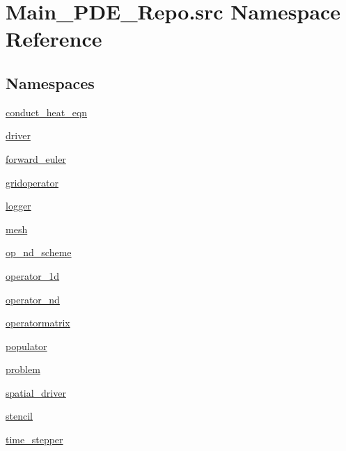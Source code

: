 \hypertarget{namespaceMain__PDE__Repo_1_1src}{}\section{Main\+\_\+\+P\+D\+E\+\_\+\+Repo.\+src Namespace Reference}
\label{namespaceMain__PDE__Repo_1_1src}
\subsection*{Namespaces}
\begin{DoxyCompactItemize}
\item 
 \hyperlink{namespaceMain__PDE__Repo_1_1src_1_1conduct__heat__eqn}{conduct\+\_\+heat\+\_\+eqn}
\item 
 \hyperlink{namespaceMain__PDE__Repo_1_1src_1_1driver}{driver}
\item 
 \hyperlink{namespaceMain__PDE__Repo_1_1src_1_1forward__euler}{forward\+\_\+euler}
\item 
 \hyperlink{namespaceMain__PDE__Repo_1_1src_1_1gridoperator}{gridoperator}
\item 
 \hyperlink{namespaceMain__PDE__Repo_1_1src_1_1logger}{logger}
\item 
 \hyperlink{namespaceMain__PDE__Repo_1_1src_1_1mesh}{mesh}
\item 
 \hyperlink{namespaceMain__PDE__Repo_1_1src_1_1op__nd__scheme}{op\+\_\+nd\+\_\+scheme}
\item 
 \hyperlink{namespaceMain__PDE__Repo_1_1src_1_1operator__1d}{operator\+\_\+1d}
\item 
 \hyperlink{namespaceMain__PDE__Repo_1_1src_1_1operator__nd}{operator\+\_\+nd}
\item 
 \hyperlink{namespaceMain__PDE__Repo_1_1src_1_1operatormatrix}{operatormatrix}
\item 
 \hyperlink{namespaceMain__PDE__Repo_1_1src_1_1populator}{populator}
\item 
 \hyperlink{namespaceMain__PDE__Repo_1_1src_1_1problem}{problem}
\item 
 \hyperlink{namespaceMain__PDE__Repo_1_1src_1_1spatial__driver}{spatial\+\_\+driver}
\item 
 \hyperlink{namespaceMain__PDE__Repo_1_1src_1_1stencil}{stencil}
\item 
 \hyperlink{namespaceMain__PDE__Repo_1_1src_1_1time__stepper}{time\+\_\+stepper}
\end{DoxyCompactItemize}
